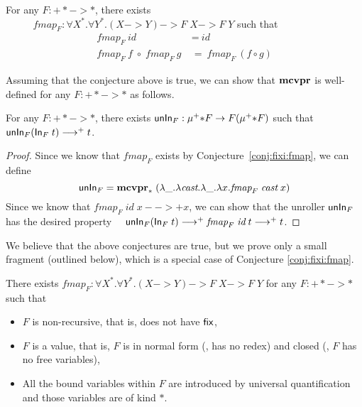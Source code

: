 \begin{conjecture}\label{conj:fixi:fmap}
For any $F : +* -> *$, there exists\\ \vspace*{-1ex}
$\phantom{A}\qquad
        \textit{fmap}_F : \forall X^{*}.\forall Y^{*}.(X -> Y) -> F\;X -> F\;Y$
\quad such that
\begin{align*}
\textit{fmap}_F~\textit{id} &~=~ \textit{id} \\
\textit{fmap}_F~\textit{f} \;\circ\; \textit{fmap}_F~\textit{g}
&~=~ \textit{fmap}_F~(f\circ g)
\end{align*}
\end{conjecture}
\noindent
Assuming that the conjecture above is true,
we can show that $\mathbf{mcvpr}$ is well-defined for any $F: +* -> *$ as follows.
\begin{conjecture} For any $F : +* -> *$, there exists
$\mathsf{unIn}_F : \mu^{+}{*} F -> F(\mu^{+}{*} F)$ such that
$\mathsf{unIn}_F (\mathsf{In}_F\;t) -->+ t$.
\end{conjecture}
\begin{proof}
Since we know that $\textit{fmap}_F$ exists by Conjecture~\ref{conj:fixi:fmap},
we can define
\[ \mathsf{unIn}_F = \mathbf{mcvpr}_{*}\;
            (\lambda\_.\lambda\textit{cast}.\lambda\_.\lambda x.\textit{fmap}_F\;\textit{cast}\;x)
\]
Since we know that $\textit{fmap}_F\;\textit{id}\;x -->+ x$,
we can show that the unroller $\mathsf{unIn}_F$ has the desired property
$\quad \mathsf{unIn}_F (\mathsf{In}_F\;t) -->+ \textit{fmap}_F\;\textit{id}\;t -->+ t $.
\end{proof}
We believe that the above conjectures are true, but we prove only
a small fragment (outlined below), which is a special case
of Conjecture \ref{conj:fixi:fmap}.
\begin{proposition}\label{prop:fixi:fmapBaseCase}
There exists
$\textit{fmap}_F : \forall X^{*}.\forall Y^{*}.(X -> Y) -> F\;X -> F\;Y$
for any $F : +* -> *$ such that
\begin{itemize}
        \item $F$ is non-recursive, that is, does not have $\mathsf{fix}$,
        \item $F$ is a value, that is, $F$ is
                in normal form (\ie, has no redex) and
                closed (\ie, $F$ has no free variables),
        \item All the bound variables within $F$ are
                introduced by universal quantification
                and those variables are of kind $*$.
\end{itemize}
\end{proposition}
